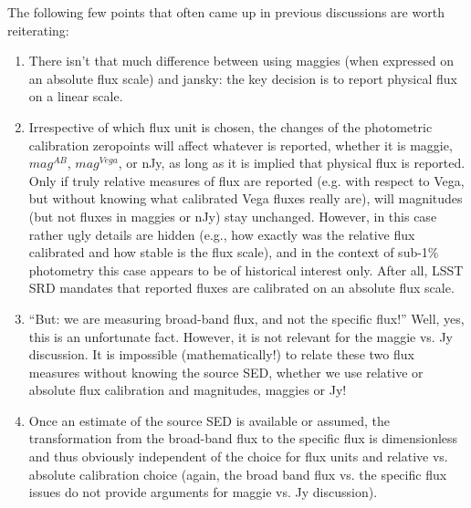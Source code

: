 \documentclass[DM,lsstdraft,toc,usenatbib]{lsstdoc}
\begin{document}
The following few points that often came up in previous discussions are worth reiterating:
\begin{enumerate}
\item There isn't that much difference between using maggies (when expressed on an
absolute flux scale) and jansky: the key decision is to report physical flux on a linear scale.
\item Irrespective of which flux unit is chosen, the changes of the photometric
calibration zeropoints will affect whatever is reported, whether it is maggie, $mag^{AB}$,
$mag^{Vega}$, or nJy, as long as it is implied that physical flux is reported. Only if
truly relative measures of flux are reported (e.g. with respect to Vega, but without knowing
what calibrated Vega fluxes really are), will magnitudes (but not fluxes in maggies or
nJy) stay unchanged. However, in this case rather ugly details are hidden (e.g., how
exactly was the relative flux calibrated and how stable is the flux scale), and in the context
of sub-1\% photometry this case appears to be of historical interest only. After all,
LSST SRD mandates that reported fluxes are calibrated on an absolute flux scale.
\item ``But: we are measuring broad-band flux, and not the specific flux!''  Well,
yes, this is an unfortunate fact. However, it is not relevant for the maggie vs. Jy discussion.
It is impossible (mathematically!) to relate these two flux measures without knowing
the source SED, whether we use relative or absolute flux calibration and magnitudes,
maggies or Jy!
\item Once an estimate of the source SED is available or assumed, the transformation from
the broad-band flux to the specific flux is dimensionless and thus obviously independent
of the choice for flux units and relative vs. absolute calibration choice (again, the broad band
flux vs. the specific flux issues do not provide arguments for maggie vs. Jy discussion).
\end{enumerate}
\end{document}
